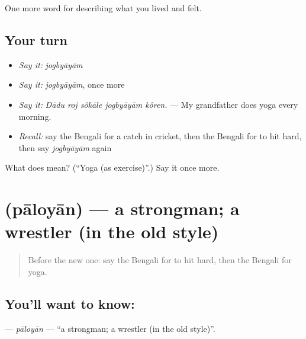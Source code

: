 \begin{grammarlens}[title={What you've built}]
One more word for describing what you lived and felt.
\end{grammarlens}

\subsection*{Your turn}
\begin{itemize}
\raggedright
  \item \emph{Say it:} \emph{jogbyāyām}
  \item \emph{Say it:} \emph{jogbyāyām}, once more
  \item \emph{Say it:} \emph{Dādu roj sôkāle jogbyāyām kôren.} — My grandfather does yoga every morning.
  \item \emph{Recall:} say the Bengali for a catch in cricket, then the Bengali for to hit hard, then say \emph{jogbyāyām} again
\end{itemize}

\begin{tcolorbox}[breakable,colback=teal!4,colframe=teal!35!black,title={Before you move on}]
What does  mean? (\textquotedblleft{}Yoga (as exercise)\textquotedblright{}.) Say it once more.
\end{tcolorbox}
\section[\texorpdfstring{\bn{পালোয়ান} (pāloyān)}{পালোয়ান (pāloyān)}]{ (pāloyān) — a strongman; a wrestler (in the old style)}

\label{lesson:BN-C522-paloyan}



\begin{quote}
Before the new one: say the Bengali for to hit hard, then the Bengali for yoga.
\end{quote}

\subsection*{You'll want to know: }
\textbf{} — \emph{pāloyān} — \textquotedblleft{}a strongman; a wrestler (in the old style)\textquotedblright{}.

\begin{quote}
      
\end{quote}

